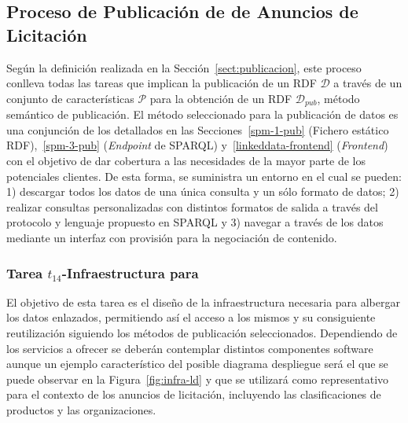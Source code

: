 \subsection{Proceso de Publicación de \linkeddata de Anuncios de Licitación}\label{sect:proceso-publicacion-ld}
Según la definición realizada en la Sección~\ref{sect:publicacion}, este proceso conlleva
todas las tareas que implican la publicación de un \dataset RDF $\mathcal{D}$ a través de un conjunto 
de características $\mathcal{P}$ para la obtención de un \dataset RDF $\mathcal{D}_{pub}$, método semántico 
de publicación. El método seleccionado para la publicación de datos es una conjunción 
de los detallados en las Secciones~\ref{spm-1-pub} (Fichero estático \gls{RDF}),~\ref{spm-3-pub} (\textit{Endpoint} de SPARQL) y~\ref{linkeddata-frontend} 
(\linkeddata \textit{Frontend}) con el objetivo de dar cobertura a las necesidades de la mayor parte de los potenciales clientes. De esta forma, 
se suministra un entorno en el cual se pueden: 1) descargar todos los datos de una única consulta y un sólo formato de datos; 2) realizar consultas personalizadas 
con distintos formatos de salida a través del protocolo y lenguaje propuesto en \gls{SPARQL} y 3) navegar a través de los datos mediante un interfaz con provisión 
para la negociación de contenido. 
% 
% 
% 
% 
% 
\subsubsection{Tarea $t_{14}$-Infraestructura para \linkeddata}\label{infraestructura-comun}
El objetivo de esta tarea es el diseño de la infraestructura necesaria para albergar los datos enlazados, permitiendo 
así el acceso a los mismos y su consiguiente reutilización siguiendo los métodos de publicación seleccionados. Dependiendo de los servicios a ofrecer se deberán contemplar 
distintos componentes software aunque un ejemplo característico del posible diagrama despliegue será el que se puede 
observar en la Figura~\ref{fig:infra-ld} y que se utilizará como representativo para el contexto de los anuncios de licitación, 
incluyendo las clasificaciones de productos y las organizaciones. 

